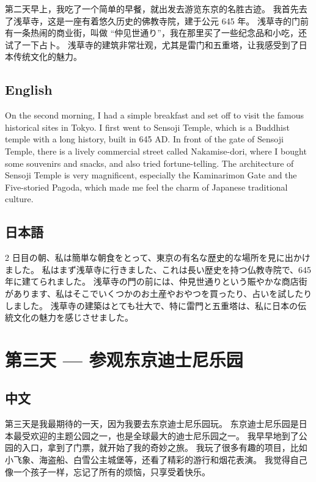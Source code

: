 \documentclass{kspaper}
\begin{document}
第二天早上，我吃了一个简单的早餐，就出发去游览东京的名胜古迹。
我首先去了浅草寺，这是一座有着悠久历史的佛教寺院，建于公元 645 年。
浅草寺的门前有一条热闹的商业街，叫做 ``仲见世通り''，我在那里买了一些纪念品和小吃，还试了一下占卜。
浅草寺的建筑非常壮观，尤其是雷门和五重塔，让我感受到了日本传统文化的魅力。

\subsection{English}

On the second morning, I had a simple breakfast and set off to visit the famous historical sites in Tokyo.
I first went to Sensoji Temple, which is a Buddhist temple with a long history, built in 645 AD.
In front of the gate of Sensoji Temple, there is a lively commercial street called Nakamise-dori,
where I bought some souvenirs and snacks, and also tried fortune-telling.
The architecture of Sensoji Temple is very magnificent, especially the Kaminarimon Gate and the Five-storied Pagoda,
which made me feel the charm of Japanese traditional culture.

\subsection{日本語}

2 日目の朝、私は簡単な朝食をとって、東京の有名な歴史的な場所を見に出かけました。
私はまず浅草寺に行きました、これは長い歴史を持つ仏教寺院で、645 年に建てられました。
浅草寺の門の前には、仲見世通りという賑やかな商店街があります、私はそこでいくつかのお土産やおやつを買ったり、占いを試したりしました。
浅草寺の建築はとても壮大で、特に雷門と五重塔は、私に日本の伝統文化の魅力を感じさせました。

\section{第三天 --- 参观东京迪士尼乐园}

\subsection{中文}

第三天是我最期待的一天，因为我要去东京迪士尼乐园玩。
东京迪士尼乐园是日本最受欢迎的主题公园之一，也是全球最大的迪士尼乐园之一。
我早早地到了公园的入口，拿到了门票，就开始了我的奇妙之旅。
我玩了很多有趣的项目，比如小飞象、海盗船、白雪公主城堡等，还看了精彩的游行和烟花表演。
我觉得自己像一个孩子一样，忘记了所有的烦恼，只享受着快乐。
\end{document}
